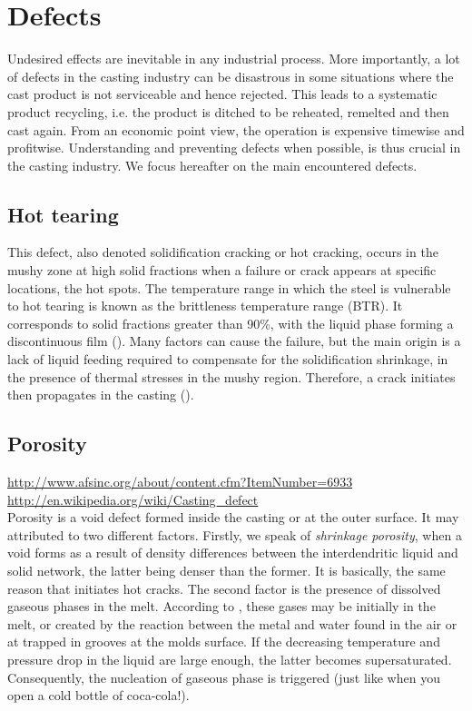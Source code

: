 \section*{Defects}
Undesired effects are inevitable in any industrial process. More importantly, a lot of defects in the casting industry can be disastrous in some situations where the cast product is not serviceable and hence rejected. This leads to a systematic product recycling, i.e. the product is ditched to be reheated, remelted and then cast again. From an economic point view, the operation is expensive timewise and profitwise. Understanding and preventing defects when possible, is thus crucial in the casting industry.
We focus hereafter on the main encountered defects.

\subsection*{Hot tearing}
This defect, also denoted solidification cracking or hot cracking, occurs in the mushy zone at high solid fractions when a failure
or crack appears at specific locations, the hot spots. The temperature range in which the steel is vulnerable to hot tearing is known as the brittleness temperature range (BTR). It corresponds to solid fractions greater than \num{90}\%, with the liquid phase forming a discontinuous film (). Many factors can cause the failure, but the main origin is a lack of liquid feeding required to compensate for the solidification shrinkage, in the presence of thermal stresses in the mushy region. Therefore, a crack initiates then propagates in the casting (). 

\subsection*{Porosity}
\url{http://www.afsinc.org/about/content.cfm?ItemNumber=6933} \\
\url{http://en.wikipedia.org/wiki/Casting_defect} \\
Porosity is a void defect formed inside the casting or at the outer surface. It may attributed to two different factors.
Firstly, we speak of \emph{shrinkage porosity}, when a void forms as a result of density differences between the interdendritic liquid and solid
network, the latter being denser than the former. It is basically, the same reason that initiates hot cracks. 
The second factor is the presence of dissolved gaseous phases in the melt. According to \citep{dantzig_solidification_2009}, these gases may be initially in the melt, or created by the reaction between the metal and water found in the air or at trapped in grooves at the molds surface. If the decreasing temperature and pressure drop in the liquid are large enough, the latter becomes supersaturated. Consequently, the nucleation of gaseous phase is triggered (just like when you open a cold bottle of coca-cola!).

